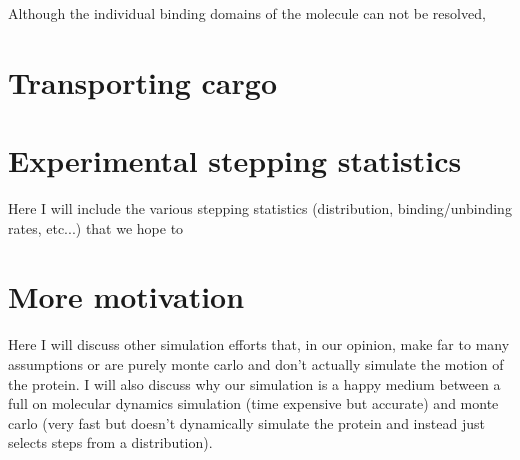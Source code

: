 Although the individual binding domains of the molecule can not be resolved, 
\section{Transporting cargo}
\section{Experimental stepping statistics}
Here I will include the various stepping statistics (distribution, binding/unbinding rates, etc...) that we hope to  


\section{More motivation} 
Here I will discuss other simulation efforts that, in our opinion, make far to many assumptions or are purely monte carlo and don't actually simulate the motion of the protein. I will also discuss why our simulation is a happy medium between a full on molecular dynamics simulation (time expensive but accurate) and monte carlo (very fast but doesn't dynamically simulate the protein and instead just selects steps from a distribution). 